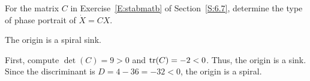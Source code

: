 \documentclass{ximera}
\begin{document}
\begin{exercise} \label{c6.8.1b}
For the matrix $C$ in Exercise~\ref{E:stabmatb} of Section~\ref{S:6.7}, 
determine the type of phase portrait of $\dot{X}=CX$.

\begin{solution}
\ans The origin is a spiral sink.

\soln First, compute $\det(C) = 9 > 0$ and ${\rm tr}(C) = -2 < 0$.  Thus,
the origin is a sink.  Since the discriminant is $D = 4 - 36 = -32 < 0$,
the origin is a spiral.

\end{solution}
\end{exercise}
\end{document}
